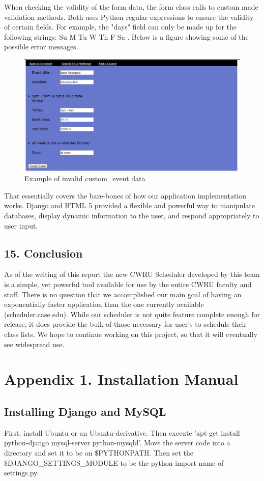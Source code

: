 \documentclass[pdftex,12pt,letter]{article}
\begin{document}
When checking the validity of the form data, the form class calls to custom made validation methods. Both uses Python regular expressions to ensure the validity of certain fields. For example, the "days" field can only be made up for the following strings: Su M Tu W Th F Sa . Below is a figure showing some of the possible error messages.
\begin{figure}
\includegraphics[width=6in]{eventErr.png}
\caption{Example of invalid custom\_event data}
\end{figure}
\FloatBarrier

That essentially covers the bare-bones of how our application implementation works. Django and HTML 5 provided a flexible and powerful way to manipulate databases, display dynamic information to the user, and respond appropriately to user input.

\subsection*{15. Conclusion}
As of the writing of this report the new CWRU Scheduler developed by this team is a simple, yet powerful tool available for use by the entire CWRU faculty and staff. There is no question that we accomplished our main goal of having an exponentially faster application than the one currently available (scheduler.case.edu). While our scheduler is not quite feature complete enough for release, it does provide the bulk of those necessary for user's to schedule their class lists. We hope to continue working on this project, so that it will eventually see widespread use.

\newpage
\appendix
\section{Appendix 1. Installation Manual}
\subsection{Installing Django and MySQL}
First, install Ubuntu or an Ubuntu-derivative.  Then execute 'apt-get install python-django mysql-server python-mysqld'.  Move the server code into a directory and set it to be on \$PYTHONPATH.  Then set the \$DJANGO\_SETTINGS\_MODULE to be the python import name of settings.py.
\end{document}
